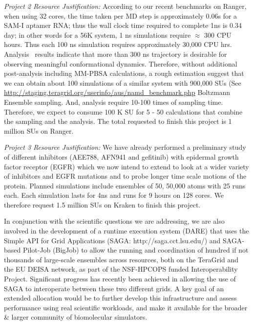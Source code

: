 \documentclass[a4paper,10pt]{article}
\begin{document}
{\it Project 2 Resource Justification: } According to our recent benchmarks on Ranger, when using 32 cores, the time taken per MD step is approximately 0.06s for a SAM-I aptamer RNA; thus the wall clock time required to complete 1ns is 0.34 day; in other words for a 56K system, 1 ns simulations require $\approx$ 300 CPU hours.  Thus each 100 ns simulation requires approximately 30,000 CPU hrs.  Analysis~\cite{SAM-I-NAR2009} results indicate that more than 300 ns trajectory is desirable for observing meaningful conformational dynamics. Therefore, without additional post-analysis including MM-PBSA calculations, a rough estimation suggest that we can obtain about 100 simulations of a similar system with 900,000 SUs (See {\url{http://staging.teragrid.org/userinfo/aus/namd_benchmark.php}} Boltzmann Ensemble sampling.  And, analysis require 10-100 times of sampling time.  Therefore, we expect to consume 100 K SU for 5 - 50 calculations that combine the sampling and the analysis. The total requested to finish this project is 1 million SUs on Ranger.

{\it Project 3 Resource Justification: } We have already performed a preliminary study of different inhibitors (AEE788, AFN941 and gefitinib) with epidermal growth factor receptor (EGFR) which we now intend to extend to look at a wider variety of inhibitors and EGFR mutations and to probe longer time scale motions of the protein. Planned simulations include ensembles of 50, 50,000 atoms with 25 runs each. Each simulation lasts for 4ns and runs for 9 hours on 128 cores. We therefore request 1.5 million SUs on Kraken to finish this project.

In conjunction with the scientific questions we are addressing, we are also involved in the development of a runtime execution system (DARE) that uses the Simple API for Grid Applications (SAGA: http://saga.cct.lsu.edu/) and SAGA-based Pilot-Job (BigJob) to allow the running and coordination of hundred if not thousands of large-scale ensembles across resources, both on the TeraGrid and the EU DEISA network, as part of the NSF-HPCOPS funded Interoperability Project. Significant progress has recently been achieved in allowing the use of SAGA to interoperate between these two different grids.  A key goal of an extended allocation would be to further develop this infrastructure and assess performance using real scientific workloads, and make it available for the broader \& larger community of biomolecular simulators.





\end{document}
